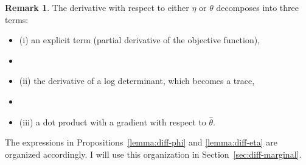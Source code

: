 \documentclass[stslayout, noinfoline]{imsart}
\theoremstyle{definition}
\newtheorem{remark}{Remark}
\begin{document}
\begin{remark} \label{remark:diff-likelihood}
The derivative with respect to either $\eta$ or $\theta$ decomposes into three terms:
\begin{itemize}
  \item[] (i) an explicit term (partial derivative of the objective function),
  \item[]
  \item[] (ii) the derivative of a log determinant, which becomes a trace,
  \item[]
  \item[] (iii) a dot product with a gradient with respect to $\hat \theta$.
\end{itemize}
The expressions in Propositions~\ref{lemma:diff-phi} and \ref{lemma:diff-eta} are organized accordingly.
I will use this organization in Section~\ref{sec:diff-marginal}. 
\end{remark}
\end{document}
